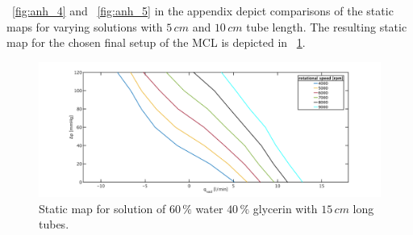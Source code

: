 \figurename~\ref{fig:anh_4} and \figurename~\ref{fig:anh_5} in the appendix depict comparisons of the static maps for varying  solutions with $5\, cm$ and $10\, cm$ tube length.
The resulting static map for the chosen final setup of the MCL is depicted in \figurename~\ref{fig:60w40glong}.

\begin{figure}[ht]
  \centering
  \includegraphics[width=\textwidth]{images/chapt_4/60w40g_long.pdf}
  \caption[Static map for solution of $60\, \%$ water $40\, \%$ glycerin with $15\,cm$ long tubes]{Static map for solution of $60\, \%$ water $40\, \%$ glycerin with $15\,cm$ long tubes.}
  \label{fig:60w40glong}
\end{figure}

